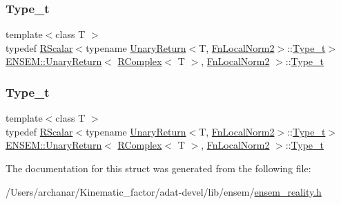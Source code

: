 \subsubsection{\texorpdfstring{Type\_t}{Type\_t}\hspace{0.1cm}{\footnotesize\ttfamily [2/3]}}
{\footnotesize\ttfamily template$<$class T $>$ \\
typedef \mbox{\hyperlink{classENSEM_1_1RScalar}{R\+Scalar}}$<$typename \mbox{\hyperlink{structENSEM_1_1UnaryReturn}{Unary\+Return}}$<$T, \mbox{\hyperlink{structENSEM_1_1FnLocalNorm2}{Fn\+Local\+Norm2}}$>$\+::\mbox{\hyperlink{structENSEM_1_1UnaryReturn_3_01RComplex_3_01T_01_4_00_01FnLocalNorm2_01_4_acf4480dbc7c87e67898043db4bd45a41}{Type\+\_\+t}}$>$ \mbox{\hyperlink{structENSEM_1_1UnaryReturn}{E\+N\+S\+E\+M\+::\+Unary\+Return}}$<$ \mbox{\hyperlink{classENSEM_1_1RComplex}{R\+Complex}}$<$ T $>$, \mbox{\hyperlink{structENSEM_1_1FnLocalNorm2}{Fn\+Local\+Norm2}} $>$\+::\mbox{\hyperlink{structENSEM_1_1UnaryReturn_3_01RComplex_3_01T_01_4_00_01FnLocalNorm2_01_4_acf4480dbc7c87e67898043db4bd45a41}{Type\+\_\+t}}}

\mbox{\label{structENSEM_1_1UnaryReturn_3_01RComplex_3_01T_01_4_00_01FnLocalNorm2_01_4_acf4480dbc7c87e67898043db4bd45a41}} 
\subsubsection{\texorpdfstring{Type\_t}{Type\_t}\hspace{0.1cm}{\footnotesize\ttfamily [3/3]}}
{\footnotesize\ttfamily template$<$class T $>$ \\
typedef \mbox{\hyperlink{classENSEM_1_1RScalar}{R\+Scalar}}$<$typename \mbox{\hyperlink{structENSEM_1_1UnaryReturn}{Unary\+Return}}$<$T, \mbox{\hyperlink{structENSEM_1_1FnLocalNorm2}{Fn\+Local\+Norm2}}$>$\+::\mbox{\hyperlink{structENSEM_1_1UnaryReturn_3_01RComplex_3_01T_01_4_00_01FnLocalNorm2_01_4_acf4480dbc7c87e67898043db4bd45a41}{Type\+\_\+t}}$>$ \mbox{\hyperlink{structENSEM_1_1UnaryReturn}{E\+N\+S\+E\+M\+::\+Unary\+Return}}$<$ \mbox{\hyperlink{classENSEM_1_1RComplex}{R\+Complex}}$<$ T $>$, \mbox{\hyperlink{structENSEM_1_1FnLocalNorm2}{Fn\+Local\+Norm2}} $>$\+::\mbox{\hyperlink{structENSEM_1_1UnaryReturn_3_01RComplex_3_01T_01_4_00_01FnLocalNorm2_01_4_acf4480dbc7c87e67898043db4bd45a41}{Type\+\_\+t}}}



The documentation for this struct was generated from the following file\+:\begin{DoxyCompactItemize}
\item 
/\+Users/archanar/\+Kinematic\+\_\+factor/adat-\/devel/lib/ensem/\mbox{\hyperlink{adat-devel_2lib_2ensem_2ensem__reality_8h}{ensem\+\_\+reality.\+h}}\end{DoxyCompactItemize}
